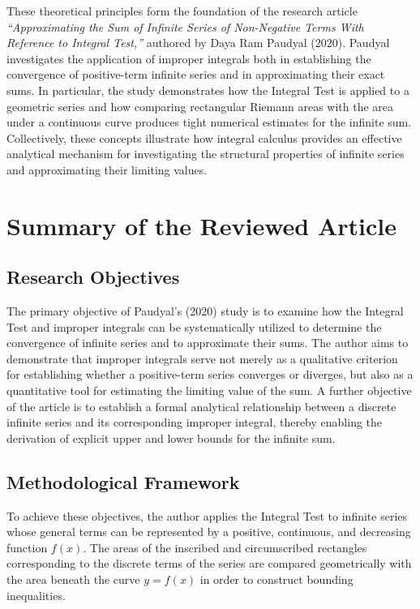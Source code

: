 \documentclass[11pt, a4paper]{article}
\begin{document}
These theoretical principles form the foundation of the research article \textit{``Approximating the Sum of Infinite Series of Non-Negative Terms With Reference to Integral Test,''} authored by Daya Ram Paudyal (2020). Paudyal investigates the application of improper integrals both in establishing the convergence of positive-term infinite series and in approximating their exact sums. In particular, the study demonstrates how the Integral Test is applied to a geometric series and how comparing rectangular Riemann areas with the area under a continuous curve produces tight numerical estimates for the infinite sum. Collectively, these concepts illustrate how integral calculus provides an effective analytical mechanism for investigating the structural properties of infinite series and approximating their limiting values.

\section{Summary of the Reviewed Article}

\subsection{Research Objectives}

The primary objective of Paudyal's (2020) study is to examine how the Integral Test and improper integrals can be systematically utilized to determine the convergence of infinite series and to approximate their sums. The author aims to demonstrate that improper integrals serve not merely as a qualitative criterion for establishing whether a positive-term series converges or diverges, but also as a quantitative tool for estimating the limiting value of the sum. A further objective of the article is to establish a formal analytical relationship between a discrete infinite series and its corresponding improper integral, thereby enabling the derivation of explicit upper and lower bounds for the infinite sum.

\subsection{Methodological Framework}

To achieve these objectives, the author applies the Integral Test to infinite series whose general terms can be represented by a positive, continuous, and decreasing function $f(x)$. The areas of the inscribed and circumscribed rectangles corresponding to the discrete terms of the series are compared geometrically with the area beneath the curve $y = f(x)$ in order to construct bounding inequalities. 
\end{document}
